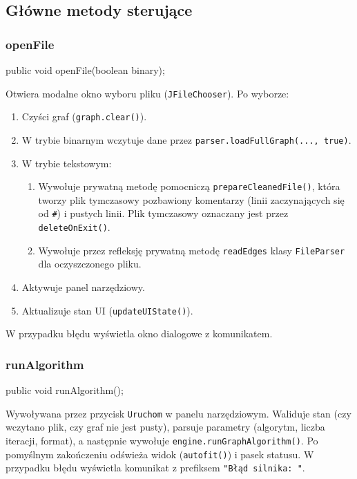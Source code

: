 \documentclass[a4paper, 11pt]{article}
\begin{document}
\subsection{Główne metody sterujące}

\subsubsection{openFile}

\begin{cmdbox}
public void openFile(boolean binary);
\end{cmdbox}

Otwiera modalne okno wyboru pliku (\texttt{JFileChooser}). Po wyborze:
\begin{enumerate}
  \item Czyści graf (\texttt{graph.clear()}).
  \item W trybie binarnym wczytuje dane przez
    \texttt{parser.loadFullGraph(..., true)}.
  \item W trybie tekstowym:
    \begin{enumerate}
      \item Wywołuje prywatną metodę pomocniczą \texttt{prepareCleanedFile()},
        która tworzy plik tymczasowy pozbawiony komentarzy (linii zaczynających się
        od \texttt{\#}) i pustych linii. Plik tymczasowy oznaczany jest przez
        \texttt{deleteOnExit()}.
      \item Wywołuje przez refleksję prywatną metodę \texttt{readEdges}
        klasy \texttt{FileParser} dla oczyszczonego pliku.
    \end{enumerate}
  \item Aktywuje panel narzędziowy.
  \item Aktualizuje stan UI (\texttt{updateUIState()}).
\end{enumerate}
W przypadku błędu wyświetla okno dialogowe z komunikatem.

\subsubsection{runAlgorithm}

\begin{cmdbox}
public void runAlgorithm();
\end{cmdbox}

Wywoływana przez przycisk \texttt{Uruchom} w panelu narzędziowym.
Waliduje stan (czy wczytano plik, czy graf nie jest pusty), parsuje
parametry (algorytm, liczba iteracji, format), a następnie wywołuje
\texttt{engine.runGraphAlgorithm()}. Po pomyślnym zakończeniu odświeża
widok (\texttt{autofit()}) i pasek statusu. W przypadku błędu wyświetla
komunikat z prefiksem \texttt{"Błąd silnika: "}.
\end{document}
